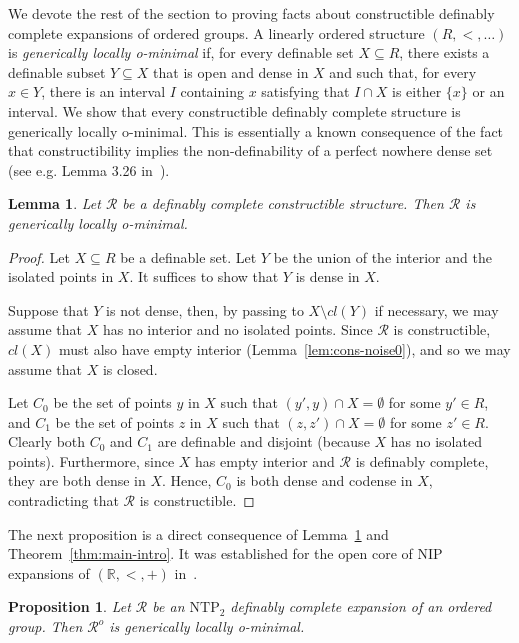 \documentclass[12pt]{article}
\newcommand{\Rr}{\mathcal{R}}
\newcommand{\R}{\mathbb{R}}
\newcommand{\NIP}{\ensuremath{\mathrm{NIP}}}
\newcommand{\NTP}{\ensuremath{\mathrm{NTP}_2}}
\newcommand{\Ro}{\Rr^o}
\newtheorem{lemma}[theorem]{Lemma}
\newtheorem{proposition}[theorem]{Proposition}
\theoremstyle{definition}
\theoremstyle{remark}
\begin{document}
We devote the rest of the section to proving facts about constructible definably complete expansions of ordered groups.  
A linearly ordered structure $(R,<,\ldots)$ is \emph{generically locally o-minimal} if, for every definable set $X\subseteq R$, there exists a definable subset $Y\subseteq X$ that is open and dense in $X$ and such that, for every $x\in Y$, there is an interval $I$ containing $x$ satisfying that $I\cap X$ is either $\{x\}$ or an interval. We show that every constructible definably complete structure is generically locally o-minimal. This is essentially a known consequence of the fact that constructibility implies the non-definability of a perfect nowhere dense set (see e.g. Lemma 3.26 in~\cite{for21}). 

\begin{lemma}\label{lem:generic-local-omin}
Let $\Rr$ be a definably complete constructible structure. Then $\Rr$ is generically locally o-minimal.      
\end{lemma}
\begin{proof}
Let $X\subseteq R$ be a definable set. Let $Y$ be the union of the interior and the isolated points in $X$. It suffices to show that $Y$ is dense in $X$. 

Suppose that $Y$ is not dense, then, by passing to $X\setminus cl(Y)$ if necessary, we may assume that $X$ has no interior and no isolated points. Since $\Rr$ is constructible, $cl(X)$ must also have empty interior (Lemma~\ref{lem:cons-noise0}), and so we may assume that $X$ is closed. 

Let $C_0$ be the set of points $y$ in $X$ such that $(y',y)\cap X=\emptyset$ for some $y'\in R$, and $C_1$ be the set of points $z$ in $X$ such that $(z,z')\cap X=\emptyset$ for some $z'\in R$. Clearly both $C_0$ and $C_1$ are definable and disjoint (because $X$ has no isolated points). Furthermore, since $X$ has empty interior and $\Rr$ is definably complete, they are both dense in $X$. Hence, $C_0$ is both dense and codense in $X$, contradicting that $\Rr$ is constructible. 
\end{proof}

The next proposition is a direct consequence of Lemma~\ref{lem:generic-local-omin} and Theorem~\ref{thm:main-intro}. It was established for the open core of $\NIP$ expansions of $(\R,<,+)$ in~\cite[Theorem C]{Wal22}.   

\begin{proposition}\label{prop:generic-local-o-min}
Let $\Rr$ be an $\NTP$ definably complete expansion of an ordered group. Then $\Ro$ is generically locally o-minimal.  
\end{proposition}
\end{document}
